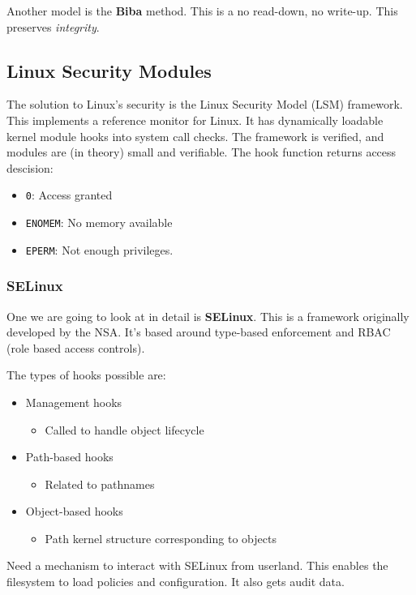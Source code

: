 \documentclass[11pt,a4paper,titlepage,dvipsnames,cmyk]{scrartcl}
\begin{document}
Another model is the \textbf{Biba} method. This is a no read-down, no write-up. This preserves \textit{integrity}.

\subsection{Linux Security Modules}
The solution to Linux's security is the Linux Security Model (LSM) framework. This implements a reference monitor for Linux. It has dynamically loadable kernel module hooks into system call checks. The framework is verified, and modules are (in theory) small and verifiable. The hook function returns access descision:
\begin{itemize}
    \item \texttt{0}: Access granted
    \item \texttt{ENOMEM}: No memory available
    \item \texttt{EPERM}: Not enough privileges.
\end{itemize}

\subsubsection{SELinux}
One we are going to look at in detail is \textbf{SELinux}. This is a framework originally developed by the NSA. It's based around type-based enforcement and RBAC (role based access controls).

The types of hooks possible are:
\begin{itemize}
    \item Management hooks
    \begin{itemize}
        \item Called to handle object lifecycle
    \end{itemize}
    \item Path-based hooks
    \begin{itemize}
        \item Related to pathnames
    \end{itemize}
    \item Object-based hooks 
    \begin{itemize}
        \item Path kernel structure corresponding to objects
    \end{itemize}
\end{itemize}

Need a mechanism to interact with SELinux from userland. This enables the filesystem to load policies and configuration. It also gets audit data.
\end{document}

